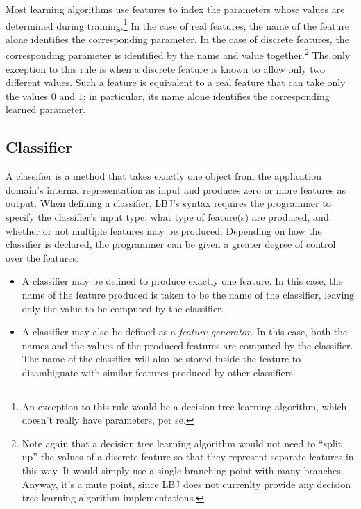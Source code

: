 Most learning algorithms use features to index the parameters whose values are
determined during training.\footnote{An exception to this rule would be a
decision tree learning algorithm, which doesn't really have parameters, per
se.}  In the case of real features, the name of the feature alone identifies
the corresponding parameter.  In the case of discrete features, the
corresponding parameter is identified by the name and value
together.\footnote{Note again that a decision tree learning algorithm would
not need to ``split up'' the values of a discrete feature so that they
represent separate features in this way.  It would simply use a single
branching point with many branches.  Anyway, it's a mute point, since LBJ does
not currenlty provide any decision tree learning algorithm implementations.}
The only exception to this rule is when a discrete feature is known to allow
only two different values.  Such a feature is equivalent to a real feature
that can take only the values $0$ and $1$; in particular, its name alone
identifies the corresponding learned parameter.

\subsection*{Classifier}
A classifier is a method that takes exactly one object from the application
domain's internal representation as input and produces zero or more features
as output.  When defining a classifier, LBJ's syntax requires the programmer
to specify the classifier's input type, what type of feature(s) are produced,
and whether or not multiple features may be produced.  Depending on how the
classifier is declared, the programmer can be given a greater degree of
control over the features:

\begin{itemize}
\item
A classifier may be defined to produce exactly one feature.  In this case, the
name of the feature produced is taken to be the name of the classifier,
leaving only the value to be computed by the classifier.

\item
A classifier may also be defined as a \emph{feature generator}.  In this case,
both the names and the values of the produced features are computed by the
classifier.  The name of the classifier will also be stored inside the feature
to disambiguate with similar features produced by other classifiers.
\end{itemize}

